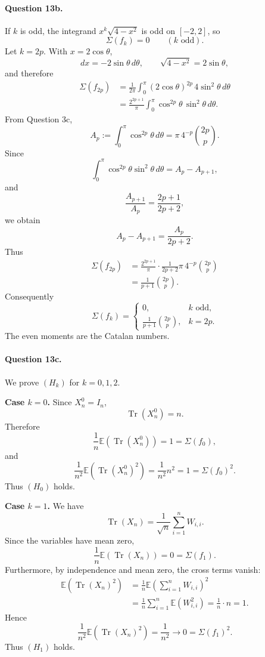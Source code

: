 \documentclass[11pt,a4paper]{article}
\newcommand{\E}{\mathbb{E}}
\DeclareMathOperator{\Tr}{Tr}
\begin{document}
\paragraph{Question 13b.}
If $k$ is odd, the integrand $x^k\sqrt{4-x^2}$ is odd on $[-2,2]$, so
\[
  \boxed{\Sigma(f_k)=0\qquad(k\text{ odd}).}
\]
Let $k=2p$.  With $x=2\cos\theta$,
\[
  dx=-2\sin\theta\,d\theta,
  \qquad
  \sqrt{4-x^2}=2\sin\theta,
\]
and therefore
\[
\begin{aligned}
 \Sigma(f_{2p})
 &=\frac1{2\pi}\int_0^\pi(2\cos\theta)^{2p}\,4\sin^2\theta\,d\theta\\
 &=\frac{2^{2p+1}}\pi\int_0^\pi\cos^{2p}\theta\,\sin^2\theta\,d\theta.
\end{aligned}
\]
From Question 3c,
\[
  A_p:=\int_0^\pi\cos^{2p}\theta\,d\theta
  =\pi\,4^{-p}\binom{2p}{p}.
\]
Since
\[
  \int_0^\pi\cos^{2p}\theta\sin^2\theta\,d\theta
  =A_p-A_{p+1},
\]
and
\[
  \frac{A_{p+1}}{A_p}=\frac{2p+1}{2p+2},
\]
we obtain
\[
  A_p-A_{p+1}=\frac{A_p}{2p+2}.
\]
Thus
\[
\begin{aligned}
 \Sigma(f_{2p})
 &=\frac{2^{2p+1}}\pi\cdot \frac{1}{2p+2}
   \pi\,4^{-p}\binom{2p}{p}\\
 &=\frac1{p+1}\binom{2p}{p}.
\end{aligned}
\]
Consequently
\[
  \boxed{
  \Sigma(f_k)=
  \begin{cases}
  0,& k\text{ odd},\\[1mm]
  \displaystyle \frac1{p+1}\binom{2p}{p},& k=2p.
  \end{cases}}
\]
The even moments are the Catalan numbers.

\paragraph{Question 13c.}
We prove $(H_k)$ for $k=0,1,2$.

\medskip
\noindent\textbf{Case $k=0$.}  Since $X_n^0=I_n$,
\[
  \Tr(X_n^0)=n.
\]
Therefore
\[
  \frac1n\E(\Tr(X_n^0))=1=\Sigma(f_0),
\]
and
\[
  \frac1{n^2}\E(\Tr(X_n^0)^2)=\frac1{n^2}n^2=1=\Sigma(f_0)^2.
\]
Thus $(H_0)$ holds.

\medskip
\noindent\textbf{Case $k=1$.}  We have
\[
  \Tr(X_n)=\frac1{\sqrt n}\sum_{i=1}^n W_{i,i}.
\]
Since the variables have mean zero,
\[
  \frac1n\E(\Tr(X_n))=0=\Sigma(f_1).
\]
Furthermore, by independence and mean zero, the cross terms vanish:
\[
\begin{aligned}
 \E(\Tr(X_n)^2)
 &=\frac1n\E\left(\sum_{i=1}^n W_{i,i}\right)^2\\
 &=\frac1n\sum_{i=1}^n\E(W_{i,i}^2)
 =\frac1n\cdot n=1.
\end{aligned}
\]
Hence
\[
  \frac1{n^2}\E(\Tr(X_n)^2)=\frac1{n^2}\longrightarrow0=\Sigma(f_1)^2.
\]
Thus $(H_1)$ holds.
\end{document}
